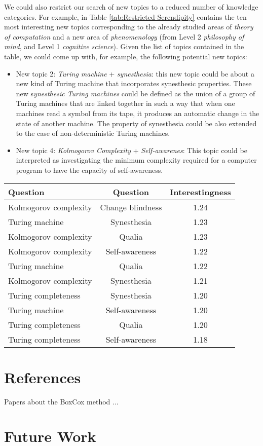 We could also restrict our search of new topics to a reduced number
of knowledge categories. For example, in Table \ref{tab:Restricted-Serendipity}
contains the ten most interesting new topics corresponding to the
already studied areas of \emph{theory of computation} and a new area
of \emph{phenomenology} (from Level 2 \emph{philosophy of mind}, and
Level 1 \emph{cognitive science}). Given the list of topics contained
in the table, we could come up with, for example, the following potential
new topics:
\begin{itemize}
\item New topic 2:\emph{ Turing machine} + \emph{synesthesia}: this new
topic could be about a new kind of Turing machine that incorporates
synesthesic properties. These new s\emph{ynesthesic Turing machines}
could be defined as the union of a group of Turing machines that are
linked together in such a way that when one machines read a symbol
from its tape, it produces an automatic change in the state of another
machine. The property of synesthesia could be also extended to the
case of non-deterministic Turing machines.
\item New topic 4:\emph{ Kolmogorov Complexity} + \emph{Self-awarenes}:
This topic could be interpreted as investigating the minimum complexity
required for a computer program to have the capacity of self-awareness.
\end{itemize}
\begin{table*}
\begin{centering}
\begin{tabular}{|l|c|c|}
\hline 
{Question} & Question & Interestingness\tabularnewline
\hline 
\hline 
Kolmogorov complexity & Change blindness & 1.24\tabularnewline
\hline 
{Turing machine} & Synesthesia & 1.23\tabularnewline
\hline 
Kolmogorov complexity & Qualia & 1.23\tabularnewline
\hline 
Kolmogorov complexity & Self-awareness & 1.22\tabularnewline
\hline 
Turing machine & Qualia & 1.22\tabularnewline
\hline 
Kolmogorov complexity & Synesthesia & 1.21\tabularnewline
\hline 
Turing completeness & Synesthesia & 1.20\tabularnewline
\hline 
Turing machine & Self-awareness & 1.20\tabularnewline
\hline 
Turing completeness & Qualia & 1.20\tabularnewline
\hline 
Turing completeness & Self-awareness & 1.18\tabularnewline
\hline 
\end{tabular}
\par\end{centering}

\caption{\label{tab:Restricted-Serendipity}Restricted New Topics}
\end{table*}


\section{References}

Papers about the BoxCox method ...

\section{Future Work}


